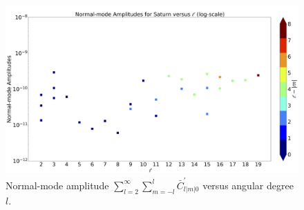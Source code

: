 \documentclass{article}
\begin{document}
\begin{figure}[h]
\centering
\includegraphics[width=1.0\textwidth]{thumbnail_SaturnAmp_NPROCAVE_VA_082423.png}
\caption{Normal-mode amplitude $\sum_{l=2}^{\infty}\sum_{m=-l}^{l}\bar{C}_{l|m|0}^{'}$ versus angular degree $l$.} \label{fig:my_label}
\end{figure}



\end{document}
